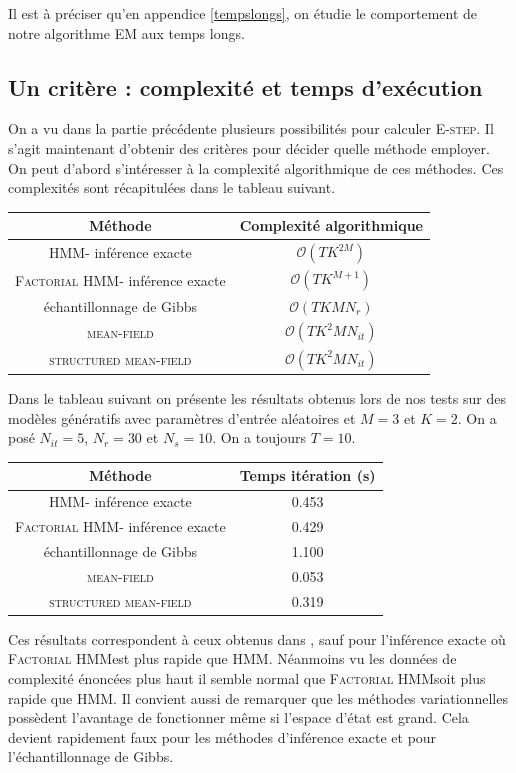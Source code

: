 \documentclass[10pt,a4paper]{article}
\newcommand{\hmm}{\textsc{HMM}}
\newcommand{\fhmm}{\textsc{Factorial HMM}}
\newcommand{\Estep}{\textsc{E-step}}
\newcommand{\EM}{\textsc{EM}}
\newcommand{\meanfield}{\textsc{mean-field}}
\newcommand{\structmeanfield}{\textsc{structured mean-field}}
\begin{document}
Il est à préciser qu'en appendice \ref{tempslongs}, on étudie le comportement de notre algorithme \EM{} aux temps longs.
\subsection{Un critère : complexité et temps d'exécution}
On a vu dans la partie précédente plusieurs possibilités pour calculer \Estep. Il s'agit maintenant
 d'obtenir des critères pour décider quelle méthode employer. On peut d'abord s'intéresser à la 
 complexité algorithmique de ces méthodes. Ces complexités sont récapitulées dans le tableau suivant.
\newline
\begin{center}
\begin{tabular}{|c|c|}
\hline
Méthode & Complexité algorithmique \\
\hline \hline
\hmm - inférence exacte &  $\mathcal{O}(TK^{2M})$ \\ \hline
\fhmm - inférence exacte &  $\mathcal{O}(TK^{M+1})$ \\ \hline
échantillonnage de Gibbs &  $\mathcal{O}(TKM N_r )$ \\ \hline
\meanfield & $\mathcal{O}(TK^2MN_{it})$ \\ \hline
\structmeanfield & $\mathcal{O}(TK^2MN_{it})$ \\ \hline
\end{tabular}
\end{center}
Dans le tableau suivant on présente les résultats obtenus lors de nos tests sur des modèles génératifs
 avec paramètres d'entrée aléatoires et $M=3$ et $K=2$. On a posé $N_{it}=5$, $N_r=30$ et $N_s=10$. On a toujours $T=10$.
 
\begin{center}
\begin{tabular}{|c|c|}
\hline
Méthode & Temps itération (s) \\
\hline \hline
\hmm - inférence exacte & 0.453  \\ \hline
\fhmm - inférence exacte & 0.429 \\ \hline
échantillonnage de Gibbs &  1.100 \\ \hline
\meanfield & 0.053 \\ \hline
\structmeanfield & 0.319 \\ \hline
\end{tabular}
\end{center}
Ces résultats correspondent à ceux obtenus dans \cite{ghahramani1997factorial}, sauf pour l'inférence
 exacte où \fhmm est plus rapide que \hmm. Néanmoins vu les données de complexité énoncées plus haut il
  semble normal que \fhmm soit plus rapide que \hmm. Il convient aussi de remarquer que les méthodes
   variationnelles possèdent l'avantage de fonctionner même si l'espace d'état est grand. Cela devient
    rapidement faux pour les méthodes d'inférence exacte et pour l'échantillonnage de Gibbs.
\end{document}
